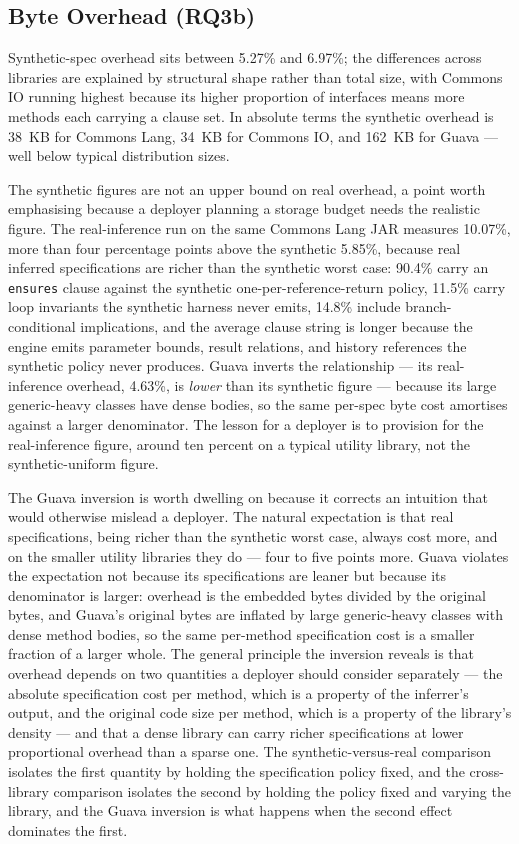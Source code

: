 \subsection{Byte Overhead (RQ3b)}

Synthetic-spec overhead sits between 5.27\% and 6.97\%; the differences across
libraries are explained by structural shape rather than total size, with Commons
IO running highest because its higher proportion of interfaces means more methods
each carrying a clause set. In absolute terms the synthetic overhead is 38~KB
for Commons Lang, 34~KB for Commons IO, and 162~KB for Guava --- well below
typical distribution sizes.

The synthetic figures are not an upper bound on real overhead, a point worth
emphasising because a deployer planning a storage budget needs the realistic
figure. The real-inference run on the same Commons Lang JAR measures 10.07\%,
more than four percentage points above the synthetic 5.85\%, because real
inferred specifications are richer than the synthetic worst case: 90.4\% carry an
\texttt{ensures} clause against the synthetic one-per-reference-return policy,
11.5\% carry loop invariants the synthetic harness never emits, 14.8\% include
branch-conditional implications, and the average clause string is longer because
the engine emits parameter bounds, result relations, and history references the
synthetic policy never produces. Guava inverts the relationship --- its
real-inference overhead, 4.63\%, is \emph{lower} than its synthetic figure ---
because its large generic-heavy classes have dense bodies, so the same per-spec
byte cost amortises against a larger denominator. The lesson for a deployer is to
provision for the real-inference figure, around ten percent on a typical utility
library, not the synthetic-uniform figure.

The Guava inversion is worth dwelling on because it corrects an intuition that
would otherwise mislead a deployer. The natural expectation is that real
specifications, being richer than the synthetic worst case, always cost more, and
on the smaller utility libraries they do --- four to five points more. Guava
violates the expectation not because its specifications are leaner but because its
denominator is larger: overhead is the embedded bytes divided by the original
bytes, and Guava's original bytes are inflated by large generic-heavy classes with
dense method bodies, so the same per-method specification cost is a smaller
fraction of a larger whole. The general principle the inversion reveals is that
overhead depends on two quantities a deployer should consider separately --- the
absolute specification cost per method, which is a property of the inferrer's
output, and the original code size per method, which is a property of the library's
density --- and that a dense library can carry richer specifications at lower
proportional overhead than a sparse one. The synthetic-versus-real comparison
isolates the first quantity by holding the specification policy fixed, and the
cross-library comparison isolates the second by holding the policy fixed and
varying the library, and the Guava inversion is what happens when the second effect
dominates the first.

